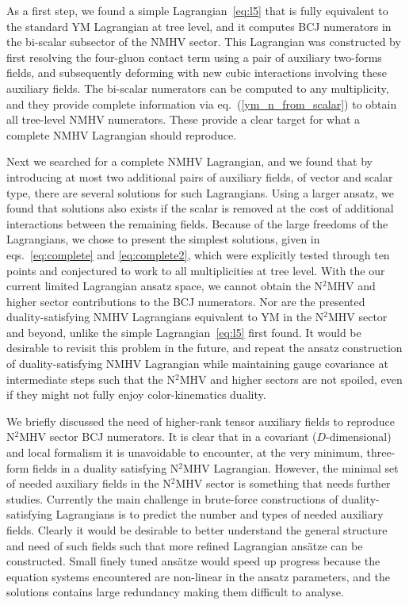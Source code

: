 \documentclass[11pt,a4paper]{article}
\def\eqn#1{eq.~(\ref{#1})}
\begin{document}
As a first step, we found a simple Lagrangian~\eqref{eq:l5} that is fully equivalent to the standard YM Lagrangian at tree level, and it computes BCJ numerators in the bi-scalar subsector of the NMHV sector. This Lagrangian was constructed by first resolving the four-gluon contact term using a pair of auxiliary two-forms fields, and subsequently deforming with new cubic interactions involving these auxiliary fields. The bi-scalar numerators can be computed to any multiplicity, and they provide complete information via \eqn{ym_n_from_scalar} to obtain all tree-level NMHV numerators. These provide a clear target for what a complete NMHV Lagrangian should reproduce.  

Next we searched for a complete NMHV Lagrangian, and we found that by introducing at most two additional pairs of auxiliary fields, of vector and scalar type, there are several solutions for such Lagrangians. Using a larger ansatz, we found that solutions also exists if the scalar is removed at the cost of additional interactions between the remaining fields. Because of the large freedoms of the Lagrangians, we chose to present the simplest solutions, given in eqs.~\eqref{eq:complete} and \eqref{eq:complete2}, which were explicitly tested through ten points and conjectured to work to all multiplicities at tree level. With the our current limited Lagrangian ansatz space, we cannot obtain the N${}^2$MHV and higher sector contributions to the BCJ numerators. Nor are the presented duality-satisfying NMHV Lagrangians equivalent to YM in the N${}^2$MHV sector and beyond, unlike the simple Lagrangian~\eqref{eq:l5} first found. It would be desirable to revisit this problem in the future, and repeat the ansatz construction of duality-satisfying NMHV Lagrangian while maintaining gauge covariance at intermediate steps such that the N${}^2$MHV and higher sectors are not spoiled, even if they might not fully enjoy color-kinematics duality.  

We briefly discussed the need of higher-rank tensor auxiliary fields to reproduce N${}^2$MHV sector BCJ numerators. It is clear that in a covariant ($D$-dimensional) and local formalism it is unavoidable to encounter, at the very minimum, three-form fields in a duality satisfying N${}^2$MHV Lagrangian. However, the minimal set of needed auxiliary fields in the N${}^2$MHV sector is something that needs further studies. Currently the main challenge in brute-force constructions of duality-satisfying Lagrangians is to predict the number and types of needed auxiliary fields. Clearly it would be desirable to better understand the general structure and need of such fields such that more refined Lagrangian ans\"{a}tze can be constructed. Small finely tuned ans\"{a}tze would speed up progress because the equation systems encountered are non-linear in the ansatz parameters, and the solutions contains large redundancy making them difficult to analyse.
\end{document}
